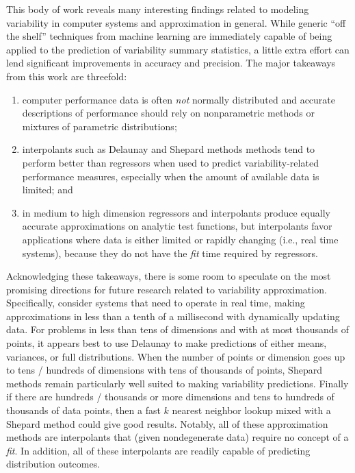 
This body of work reveals many interesting findings related to modeling variability in computer systems and approximation in general. While generic ``off the shelf'' techniques from machine learning are immediately capable of being applied to the prediction of variability summary statistics, a little extra effort can lend significant improvements in accuracy and precision. The major takeaways from this work are threefold:

\begin{enumerate}
\item computer performance data is often \textit{not} normally distributed and accurate descriptions of performance should rely on nonparametric methods or mixtures of parametric distributions;
\item interpolants such as Delaunay and Shepard methods methods tend to perform better than regressors when used to predict variability-related performance measures, especially when the amount of available data is limited; and
\item in medium to high dimension regressors and interpolants produce equally accurate approximations on analytic test functions, but interpolants favor applications where data is either limited or rapidly changing (i.e., real time systems), because they do not have the \textit{fit} time required by regressors.
\end{enumerate}

Acknowledging these takeaways, there is some room to speculate on the most promising directions for future research related to variability approximation. Specifically, consider systems that need to operate in real time, making approximations in less than a tenth of a millisecond with dynamically updating data. For problems in less than tens of dimensions and with at most thousands of points, it appears best to use Delaunay to make predictions of either means, variances, or full distributions. When the number of points or dimension goes up to tens / hundreds of dimensions with tens of thousands of points, Shepard methods remain particularly well suited to making variability predictions. Finally if there are hundreds / thousands or more dimensions and tens to hundreds of thousands of data points, then a fast $k$ nearest neighbor lookup mixed with a Shepard method could give good results. Notably, all of these approximation methods are interpolants that (given nondegenerate data) require no concept of a \textit{fit}. In addition, all of these interpolants are readily capable of predicting distribution outcomes.


